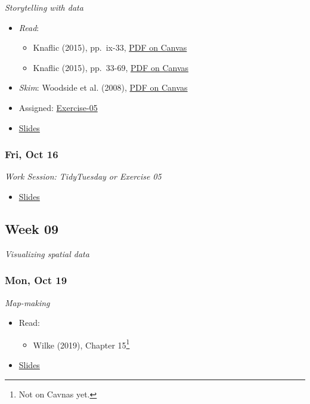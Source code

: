 \documentclass[
  letterpaper,
  DIV=11,
  numbers=noendperiod]{scrartcl}
\providecommand{\tightlist}{%
  \setlength{\itemsep}{0pt}\setlength{\parskip}{0pt}}
\begin{document}
\emph{Storytelling with data}

\begin{itemize}
\tightlist
\item
  \emph{Read}:

  \begin{itemize}
  \tightlist
  \item
    Knaflic (2015), pp.~ix-33,
    \href{https://psu.instructure.com/courses/2484925/files?preview=193922725}{PDF
    on Canvas}
  \item
    Knaflic (2015), pp.~33-69,
    \href{https://psu.instructure.com/courses/2484925/files?preview=193922725}{PDF
    on Canvas}
  \end{itemize}
\item
  \emph{Skim}: Woodside et al. (2008),
  \href{https://psu.instructure.com/courses/2484925/files?preview=193922828}{PDF
  on Canvas}
\item
  {Assigned}: \href{exercises/ex-05-tbd.qmd}{Exercise-05}
\item
  \href{404.qmd}{Slides}
\end{itemize}

\subsubsection*{Fri, Oct 16}\label{fri-oct-16}

\emph{Work Session: TidyTuesday or Exercise 05}

\begin{itemize}
\tightlist
\item
  \href{404.qmd}{Slides}
\end{itemize}

\subsection*{Week 09}\label{week-09}

\emph{Visualizing spatial data}

\subsubsection*{Mon, Oct 19}\label{mon-oct-19}

\emph{Map-making}

\begin{itemize}
\tightlist
\item
  Read:

  \begin{itemize}
  \tightlist
  \item
    Wilke (2019), Chapter 15\footnote{Not on Cavnas yet.}
  \end{itemize}
\item
  \href{404.qmd}{Slides}
\end{itemize}
\end{document}
